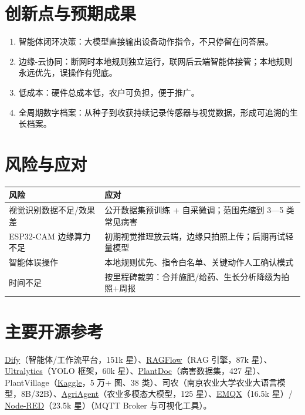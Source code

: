 \documentclass[11pt]{ctexart}
\begin{document}
\section{创新点与预期成果}
\begin{enumerate}
  \item 智能体闭环决策：大模型直接输出设备动作指令，不只停留在问答层。
  \item 边缘-云协同：断网时本地规则独立运行，联网后云端智能体接管；本地规则永远优先，误操作有兜底。
  \item 低成本：硬件总成本低，农户可负担，便于推广。
  \item 全周期数字档案：从种子到收获持续记录传感器与视觉数据，形成可追溯的生长档案。
\end{enumerate}

\section{风险与应对}
\begin{longtable}{p{5.2cm}p{9.5cm}}
  \toprule
  风险 & 应对 \\
  \midrule
  视觉识别数据不足/效果差 & 公开数据集预训练 + 自采微调；范围先缩到 3—5 类常见病害 \\
  ESP32-CAM 边缘算力不足 & 初期视觉推理放云端，边缘只拍照上传；后期再试轻量模型 \\
  智能体误操作 & 本地规则优先、指令白名单、关键动作人工确认模式 \\
  时间不足 & 按里程碑裁剪：合并施肥/给药、生长分析降级为拍照+周报 \\
  \bottomrule
\end{longtable}

\section{主要开源参考}
\href{https://github.com/langgenius/dify}{Dify}（智能体/工作流平台，151k 星）、\href{https://github.com/infiniflow/ragflow}{RAGFlow}（RAG 引擎，87k 星）、\href{https://github.com/ultralytics/ultralytics}{Ultralytics}（YOLO 框架，60k 星）、\href{https://github.com/pratikkayal/PlantDoc-Dataset}{PlantDoc}（病害数据集，427 星）、PlantVillage（\href{https://www.kaggle.com/datasets/abdallahalidev/plantvillage-dataset}{Kaggle}，5 万+ 图、38 类）、司农（南京农业大学农业大语言模型，8B/32B）、\href{https://github.com/zhiweihu1103/AgriAgent}{AgriAgent}（农业多模态大模型，125 星）、\href{https://github.com/emqx/emqx}{EMQX}（16.5k 星）/ \href{https://github.com/node-red/node-red}{Node-RED}（23.5k 星）（MQTT Broker 与可视化工具）。
\end{document}
